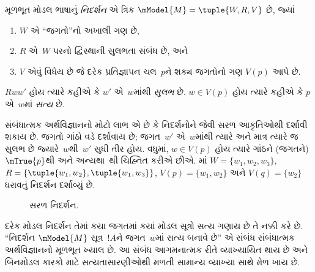 \begin{defn}
  મૂળભૂત મોડલ ભાષાનું \emph{નિદર્શન} એ ત્રિક
  $\mModel{M} = \tuple{W, R, V}$ છે, જ્યાં
  \begin{enumerate}
  \item $W$ એ ``જગતો''નો અખાલી ગણ છે,
  \item $R$ એ~$W$ પરનો દ્વિસ્થાની સુલભતા સંબંધ છે, અને
  \item $V$ એવું વિધેય છે જે દરેક પ્રતિજ્ઞાપન ચલ~$p$ને શક્ય જગતોનો ગણ $V(p)$ આપે છે.
  \end{enumerate}
  $Rww'$ હોય ત્યારે કહીએ કે $w'$ એ~$w$માંથી \emph{સુલભ}
  છે. $w \in V(p)$ હોય ત્યારે કહીએ કે $p$ એ~$w$માં
  \emph{સત્ય} છે.
\end{defn}

સંબંધાત્મક અર્થવિજ્ઞાનનો મોટો લાભ એ છે કે નિદર્શનોને
 જેવી સરળ આકૃતિઓથી દર્શાવી શકાય છે.
જગતો ગાંઠો વડે દર્શાવાય છે; જગત~$w'$ એ~$w$માંથી
ત્યારે અને માત્ર ત્યારે જ સુલભ છે જ્યારે~$w$થી~$w'$
સુધી તીર હોય. વધુમાં, $w \in V(p)$ હોય ત્યારે ગાંઠને
(જગતને)~$\mTrue{p}$થી અને અન્યથા~થી
ચિહ્નિત કરીએ છીએ. માં
$W = \{w_1, w_2, w_3\}$, $R = \{\tuple{w_1, w_2},\tuple{w_1,
  w_3}\}$, $V(p) = \{w_1, w_2\}$ અને $V(q) = \{w_2\}$
ધરાવતું નિદર્શન દર્શાવ્યું છે.

\begin{figure}
  \begin{center}
  \end{center}
  \caption{સરળ નિદર્શન.}
\end{figure}
\endgroup

\begingroup
\makeatletter{}\makeatother


\label{guunit:OLP-0413}


દરેક મોડલ નિદર્શન તેમાં કયા જગતમાં કયાં મોડલ સૂત્રો
સત્ય ગણાય છે તે નક્કી કરે છે. ``નિદર્શન $\mModel{M}$
સૂત્ર~$!A$ને જગત~$w$માં સત્ય બનાવે છે'' એ સંબંધ
સંબંધાત્મક અર્થવિજ્ઞાનનો મૂળભૂત ખ્યાલ છે. આ સંબંધ
આગમનાત્મક રીતે વ્યાખ્યાયિત થાય છે અને બિનમોડલ
કારકો માટે સત્યતાસારણીઓથી મળતી સામાન્ય વ્યાખ્યા
સાથે મેળ ખાય છે.

